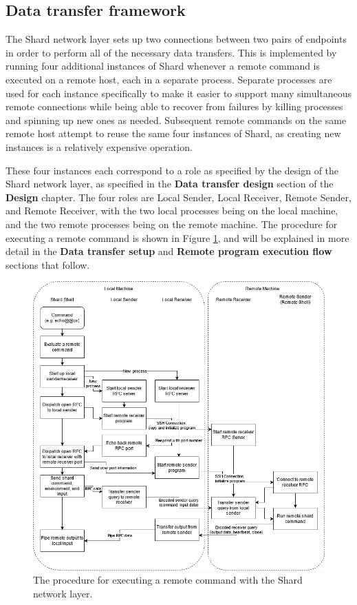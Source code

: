 \documentclass[twoside]{report}
\begin{document}
\subsection{Data transfer framework}

The Shard network layer sets up two connections between two pairs of endpoints in order to perform all of the necessary data transfers.
This is implemented by running four additional instances of Shard whenever a remote command is executed on a remote host, each in a separate process.
Separate processes are used for each instance specifically to make it easier to support many simultaneous remote connections while being able to recover from failures by killing processes and spinning up new ones as needed.
Subsequent remote commands on the same remote host attempt to reuse the same four instances of Shard, as creating new instances is a relatively expensive operation.

These four instances each correspond to a role as specified by the design of the Shard network layer, as specified in the \textbf{Data transfer design} section of the \textbf{Design} chapter.
The four roles are Local Sender, Local Receiver, Remote Sender, and Remote Receiver, with the two local processes being on the local machine, and the two remote processes being on the remote machine.
The procedure for executing a remote command is shown in Figure \ref{fig:network_layer_impl}, and will be explained in more detail in the \textbf{Data transfer setup} and \textbf{Remote program execution flow} sections that follow.

\begin{figure}[h]
  \begin{center}
    \includegraphics[scale=0.5]{img/shard_protocol_impl.png}
    \caption{The procedure for executing a remote command with the Shard network layer.}
    \label{fig:network_layer_impl}
  \end{center}
\end{figure}
\end{document}
